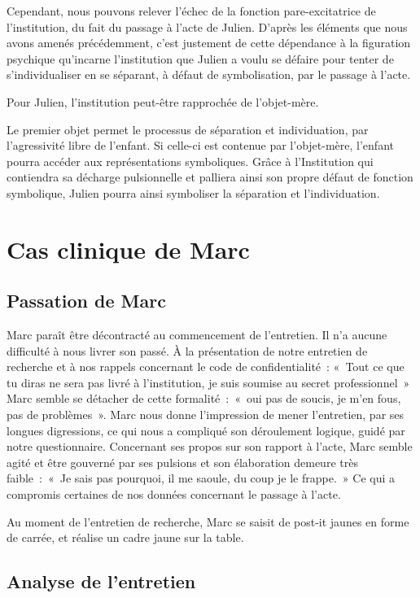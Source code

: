 \documentclass[12pt, a4paper]{book}
\begin{document}
\begin{spacing}{1.5}
Cependant, nous pouvons relever l'échec de la fonction pare-excitatrice de l'institution, du fait du passage à l'acte de Julien. D'après les éléments que nous avons amenés précédemment, c'est justement de cette dépendance à la figuration psychique qu'incarne l'institution que Julien a voulu se défaire pour tenter de s'individualiser en se séparant, à défaut de symbolisation, par le passage à l'acte. 

Pour Julien, l'institution peut-être rapprochée de l'objet-mère. 

Le premier objet permet le processus de séparation et individuation, par l'agressivité libre de l'enfant. Si celle-ci est contenue par l'objet-mère, l'enfant pourra accéder aux représentations symboliques. Grâce à l'Institution qui contiendra sa décharge pulsionnelle et palliera ainsi son propre défaut de fonction symbolique, Julien pourra ainsi symboliser la séparation et l'individuation. 

\section{Cas clinique de Marc}

\subsection{Passation de Marc}

Marc paraît être décontracté au commencement de l'entretien. Il n'a aucune difficulté à nous livrer son passé. À la présentation de notre entretien de recherche et à nos rappels concernant le code de confidentialité : « Tout ce que tu diras ne sera pas livré à l'institution, je suis soumise au secret professionnel » Marc semble se détacher de cette formalité : « oui pas de soucis, je m'en fous, pas de problèmes ». Marc nous donne l'impression de mener l'entretien, par ses longues digressions, ce qui nous a compliqué son déroulement logique, guidé par notre questionnaire. Concernant ses propos sur son rapport à l'acte, Marc semble agité et être gouverné par ses pulsions et son élaboration demeure très faible : « Je sais pas pourquoi, il me saoule, du coup je le frappe. » Ce qui a compromis certaines de nos données concernant le passage à l'acte.

Au moment de l'entretien de recherche, Marc se saisit de post-it jaunes en forme de carrée, et réalise un cadre jaune sur la table.

\subsection{Analyse de l'entretien}


\end{spacing}
\end{document}

